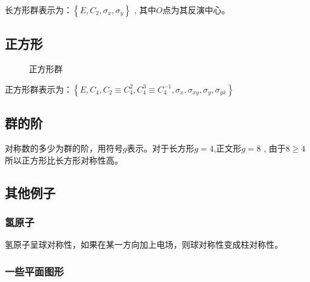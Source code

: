 \documentclass[math=mtpro2,lang=cn,color=green,device=pad]{elegantbook}
\begin{document}
长方形群表示为：$\left\{ E , C_2, \sigma_x, \sigma_y  \right\}$ , 其中$O$点为其反演中心。

\subsection{正方形}

\begin{figure}[H]
   \centering
   \caption{正方形群}
   \label{fig:group2}
\end{figure}

正方形群表示为：$\left\{ E,C_4, C_2\equiv C_4^2, C_4^3\equiv C_4^{-1},\sigma_x,\sigma_{xy},\sigma_y, \sigma_{y\overline{x}} \right\}$

\subsection{群的阶}

对称数的多少为群的阶，用符号$g$表示。对于长方形$g=4$,正文形$g=8$ , 由于$8\geq 4$ 所以正方形比长方形对称性高。


\subsection{其他例子}

\subsubsection{氢原子}

氢原子呈球对称性，如果在某一方向加上电场，则球对称性变成柱对称性。

\subsubsection{一些平面图形}
\end{document}
